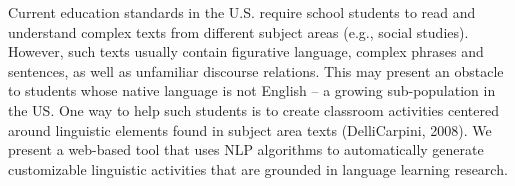 Current education standards in the U.S. require school students to read and understand complex texts from different subject areas (e.g., social studies). However, such texts usually contain figurative language, complex phrases and sentences, as well as unfamiliar discourse relations. This may present an obstacle to students whose native language is not English -- a growing sub-population in the US. One way to help such students is to create classroom activities centered around linguistic elements found in subject area texts (DelliCarpini, 2008). We present a web-based tool that uses NLP algorithms to automatically generate customizable linguistic activities that are grounded in language learning research.
